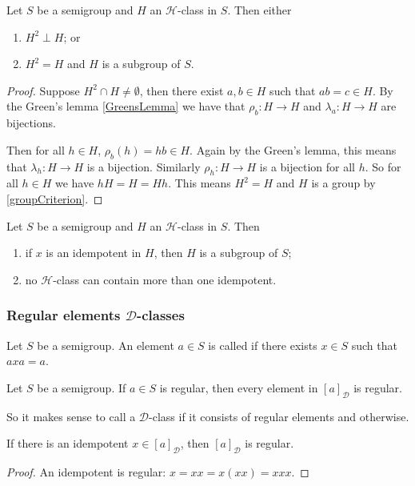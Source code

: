 \begin{theorem}
Let $S$ be a semigroup and $H$ an $\mathcal{H}$-class in $S$. Then either
\begin{enumerate}
\item $H^2\perp H$; or
\item $H^2 = H$ and $H$ is a subgroup of $S$.
\end{enumerate}
\end{theorem}
\begin{proof}
Suppose $H^2\cap H \neq \emptyset$, then there exist $a,b\in H$ such that $ab = c\in H$. By the Green's lemma \ref{GreensLemma} we have that $\rho_b:H\to H$ and $\lambda_a: H\to H$ are bijections.

Then for all $h\in H$, $\rho_b(h) = hb \in H$. Again by the Green's lemma, this means that $\lambda_h: H\to H$ is a bijection. Similarly $\rho_h: H\to H$ is a bijection for all $h$. So for all $h\in H$ we have $hH = H = Hh$. This means $H^2 = H$ and $H$ is a group by \ref{groupCriterion}.
\end{proof}
\begin{corollary} \label{GreensTheoremCorollary}
Let $S$ be a semigroup and $H$ an $\mathcal{H}$-class in $S$. Then
\begin{enumerate}
\item if $x$ is an idempotent in $H$, then $H$ is a subgroup of $S$;
\item no $\mathcal{H}$-class can contain more than one idempotent. 
\end{enumerate}
\end{corollary}

\subsubsection{Regular elements $\mathcal{D}$-classes}
\begin{definition}
Let $S$ be a semigroup. An element $a\in S$ is called  if there exists $x\in S$ such that $axa = a$.
\end{definition}

\begin{proposition} 
Let $S$ be a semigroup. If $a\in S$ is regular, then every element in $[a]_{\mathcal{D}}$ is regular.
\end{proposition}
So it makes sense to call a $\mathcal{D}$-class  if it consists of regular elements and  otherwise.
\begin{corollary}
If there is an idempotent $x\in [a]_{\mathcal{D}}$, then $[a]_{\mathcal{D}}$ is regular.
\end{corollary}
\begin{proof}
An idempotent is regular: $x = xx = x(xx) = xxx$.
\end{proof}

